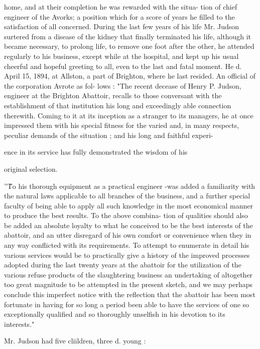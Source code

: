 home, and at their completion he was rewarded with the situa- 
tion of chief engineer of the Avorks; a position which for a 
score of years he filled to the satisfaction of all concerned. 
During the last few years of his life Mr. Judson surtered from 
a disease of the kidney that finally terminated his life, 
although it became necessary, to prolong life, to remove 
one foot after the other, he attended regularly to his business, 
except while at the hospital, and kept up his usual cheerful 
and hopeful greeting to all, even to the last and fatal moment. 
He d. April 15, 1894, at Allston, a part of Brighton, where 
he last resided. An official of the corporation Avrote as fol- 
lows : "The recent decease of Henry P. Judson, engineer 
at the Brighton Abattoir, recalls to those conversant with the 
establishment of that institution his long and exceedingly 
able connection therewith. Coming to it at its inception as a 
stranger to its managers, he at once impressed them with his 
special fitness for the varied and, in many respects, peculiar 
demands of the situation ; and his long and faithful experi- 




 ence in its service has fully demonstrated the wisdom of his 

original selection. 

''\^To his thorough equipment as a practical engineer -was 
added a familiarity with the natural laws applicable to all 
branches of the business, and a further special faculty of 
being able to apply all such knowledge in the most economical 
manner to produce the best results. To the above combina- 
tion of qualities should also be added an absolute loyalty to 
what he conceived to be the best interests of the abattoir, 
and an utter disregard of his own comfort or convenience 
when they in any way conflicted with its requirements. To 
attempt to enumerate in detail his various services would be 
to practically give a history of the improved processes 
adopted during the last twenty years at the abattoir for the 
utilization of the various refuse products of the slaughtering 
business  an undertaking of altogether too great magnitude 
to be attempted in the present sketch, and we may perhaps 
conclude this imperfect notice with the reflection that the 
abattoir has been most fortunate in having for so long a 
period been able to have the services of one so exceptionally 
qualified and so thoroughly unselfish in his devotion to its 
interests." 

Mr. Judson had five cliildren, three d. young : 

